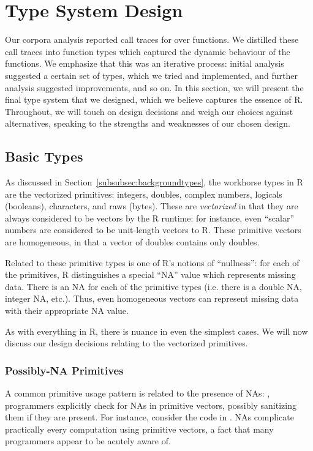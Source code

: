 \documentclass[acmsmall,review,anonymous]{acmart}\settopmatter{printfolios=true,printccs=false,printacmref=false}
\begin{document}
%
%
%
%
%
%
\section{Type System Design}
\label{sec:typesystemdesign}

Our corpora analysis reported  call traces for over  functions.
We distilled these call traces into function types which captured the dynamic behaviour of the functions.
We emphasize that this was an iterative process: initial analysis suggested a certain set of types, which we tried and implemented, and further analysis suggested improvements, and so on.
In this section, we will present the final type system that we designed, which we believe captures the essence of R.
Throughout, we will touch on design decisions and weigh our choices against alternatives, speaking to the strengths and weaknesses of our chosen design.

%
%
%
%
\subsection{Basic Types}
\label{subsec:basictypes}

As discussed in Section~\ref{subsubsec:backgroundtypes}, the workhorse types in R are the vectorized primitives: integers, doubles, complex numbers, logicals (booleans), characters, and raws (bytes).
These are {\it vectorized} in that they are always considered to be vectors by the R runtime: for instance, even ``scalar'' numbers are considered to be unit-length vectors to R.
These primitive vectors are homogeneous, in that a vector of doubles contains only doubles.

Related to these primitive types is one of R's notions of ``nullness'': for each of the primitives, R distinguishes a special ``NA'' value which represents missing data.
There is an NA for each of the primitive types (i.e. there is a double NA, integer NA, etc.).
Thus, even homogeneous vectors can represent missing data with their appropriate NA value.

As with everything in R, there is nuance in even the simplest cases.
We will now discuss our design decisions relating to the vectorized primitives.

%
%
\subsubsection{Possibly-NA Primitives}

A common primitive usage pattern is related to the presence of NAs: , programmers explicitly check for NAs in primitive vectors, possibly sanitizing them if they are present.
For instance, consider the code in .
NAs complicate practically every computation using primitive vectors, a fact that many programmers appear to be acutely aware of.
\end{document}
